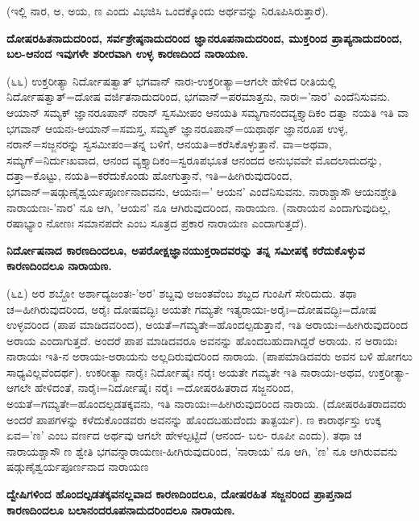 (ಇಲ್ಲಿ ನಾರ, ಅ, ಅಯ, ಣ ಎಂದು ವಿಭಜಿಸಿ ಒಂದಕ್ಕೊಂದು ಅರ್ಥವನ್ನು ನಿರೂಪಿಸಿರುತ್ತಾರೆ).

\begin{center}
\textbf{ದೋಷರಹಿತನಾದುದರಿಂದ, ಸರ್ವಶ್ರೇಷ್ಠನಾದುದರಿಂದ ಜ್ಞಾನರೂಪನಾದುದರಿಂದ, ಮುಕ್ತರಿಂದ ಪ್ರಾಪ್ಯನಾದುದರಿಂದ, ಬಲ-ಆನಂದ ಇವುಗಳೇ ಶರೀರವಾಗಿ ಉಳ್ಳ ಕಾರಣದಿಂದ ನಾರಾಯಣ.}
\end{center}

(೬೬) ಉಕ್ತರೀತ್ಯಾ ನಿರ್ದೋಷತ್ವಾತ್ ಭಗವಾನ್ ನಾರಃ-ಉಕ್ತರೀತ್ಯಾ=ಆಗಲೇ ಹೇಳಿದ ರೀತಿಯಲ್ಲಿ ನಿರ್ದೋಷತ್ವಾತ್=ದೋಷ ವರ್ಜಿತನಾದುದರಿಂದ, ಭಗವಾನ್=ಪರಮಾತ್ತನು, ನಾರಃ='ನಾರ' ಎಂದೆನಿಸುವನು. ಆಯಾನ್ ಸಮ್ಯಕ್ ಜ್ಞಾನರೂಪಾನ್ ನರಾನ್ ಸ್ವಸಮೀಪಂ ಆನಯತಿ ಸಮ್ಯಗಾನಂದವ್ಯಕ್ತ್ಯಾದಿಕಂ ದತ್ವಾ ನಯತಿ ಇತಿ ವಾ ಭಗವಾನ್ ಆಯನಃ-ಆಯಾನ್=ಸಮಸ್ತ, ಸಮ್ಯಕ್ ಜ್ಞಾನರೂಪಾನ್=ಯಥಾರ್ಥ ಜ್ಞಾನರೂಪ ಉಳ್ಳ, ನರಾನ್=ಸಜ್ಜನರನ್ನು ಸ್ವಸಮೀಪಂ=ತನ್ನ ಬಳಿಗೆ, ಆನಯತಿ=ಕರೆಸಿಕೊಳ್ಳುತ್ತಾನೆ. ವಾ=ಅಥವಾ, ಸಮ್ಯಗ್=ನಿರ್ದುಃಖವಾದ, ಆನಂದ ವ್ಯಕ್ತ್ಯಾದಿಕಂ=ಸ್ವರೂಪಭೂತ ಆನಂದದ ಅನುಭವವೇ ಮೊದಲಾದುದನ್ನು, ದತ್ತಾ=ಕೊಟ್ಟು, ನಯತಿ=ಕರೆದುಕೊಂಡು ಹೋಗುತ್ತಾನೆ, ಇತಿ=ಹೀಗಿರುವುದರಿಂದ, ಭಗವಾನ್=ಷಡ್ಗುಣೈಶ್ವರ್ಯಪೂರ್ಣನಾದವನು, ಆಯನಃ=' ಆಯನ' ಎಂದೆನಿಸುವನು. ನಾರಾಶ್ಚಾಸೌ ಆಯನಶ್ಚೇತಿ ನಾರಾಯಣಃ-'ನಾರ' ನೂ ಆಗಿ, 'ಆಯನ' ನೂ ಆಗಿರುವುದರಿಂದ, ನಾರಾಯಣ. (ನಾರಾಯನ ಎಂದಾಗುವುದಿಲ್ಲ, ರಷಾಭ್ಯಾಂ ನೋಣಃ ಸಮಾನಪದೇ ಎಂಬ ಸೂತ್ರದ ಪ್ರಕಾರ ನಾರಾಯಣ ಎಂದಾಗುತ್ತದೆ).

\begin{center}
\textbf{ನಿರ್ದೋಷನಾದ ಕಾರಣದಿಂದಲೂ, ಅಪರೋಕ್ಷಜ್ಞಾನಯುಕ್ತರಾದವರನ್ನು ತನ್ನ ಸಮೀಪಕ್ಕೆ ಕರೆದುಕೊಳ್ಳುವ ಕಾರಣದಿಂದಲೂ ನಾರಾಯಣ.}
\end{center}

(೬೭) ಅರ ಶಬ್ದೋ ಅರ್ಶಾದ್ಯಜಂತಃ-'ಅರ' ಶಬ್ದವು ಅಜಂತವೆಂಬ ಶಬ್ದದ ಗುಂಪಿಗೆ ಸೇರಿದುದು. ತಥಾ ಚ=ಹೀಗಿರುವುದರಿಂದ, ಅರೈಃ ದೋಷವದ್ಭಿಃ ಅಯತೇ ಗಮ್ಯತೇ ಇತ್ಯರಾಯಃ-ಅರೈಃ=ದೋಷವದ್ಭಿಃ=ದೋಷ ಉಳ್ಳವರಿಂದ (ಪಾಪ ಮಾಡಿದವರಿಂದ), ಅಯತೆ=ಗಮ್ಯತೇ=ಹೊಂದಲ್ಪಡುತ್ತಾನೆ, ಇತಿ ಅರಾಯಃ=ಹೀಗಿರುವುದರಿಂದ ಅರಾಯ ಎಂದಾಗುತ್ತದೆ. ಅಂದರೆ ಪಾಪ ಮಾಡಿದವರೂ ಅವನನ್ನು ಹೊಂದಬಹುದಾಗಿದ್ದರೆ ಅರಾಯ. ನ ಅರಾಯಃ ನಾರಾಯಃ ಇತಿ-ನ ಅರಾಯಃ-ಅರಾಯನು ಅಲ್ಲದಿರುವುದರಿಂದ ನಾರಾಯ. (ಪಾಪಮಾಡಿದವರು ಅವನ ಬಳಿ ಹೋಗಲು ಸಾಧ್ಯವಿಲ್ಲವೆಂದರ್ಥ). ಉಕರೀತ್ಯಾ ನಾರೈಃ ನಿರ್ದೋಷೈಃ ನರೈಃ ಅಯತೇ ಗಮ್ಯತೇ ಇತಿ ನಾರಾಯಃ-ಅಥವ, ಉಕ್ತರೀತ್ಯಾ-ಆಗಲೇ ಹೇಳಿದಂತೆ, ನಾರೈಃ=ನಿರ್ದೋಷೈಃ ನರೈಃ =ದೋಷರಹಿತರಾದ ಸಜ್ಜನರಿಂದ, ಅಯತೆ=ಗಮ್ಯತೇ=ಹೊಂದಲ್ಪಡತಕ್ಕವನು, ಇತಿ ನಾರಾಯಃ=ಹೀಗಿರುವುದರಿಂದ ನಾರಾಯ. (ದೋಷರಹಿತರಾದವರು ಅಂದರೆ ಪಾಪಗಳನ್ನು ಕಳೆದುಕೊಂಡವರು ಅವನನ್ನು ಹೊಂದಬಹುದೆಂದು ತಾತ್ಪರ್ಯ). ಣ ಕಾರಾರ್ಥಸ್ತು ಉಕ್ಕ ಏವ='ಣ' ಎಂಬ ವರ್ಣದ ಅರ್ಥವು ಆಗಲೇ ಹೇಳಲ್ಪಟ್ಟಿದೆ (ಆನಂದ- ಬಲ- ರೂಪೀ ಎಂದು). ತಥಾ ಚ ನಾರಾಯಶ್ಚಾಸೌ ಣ ಶ್ವೇತಿ ಭಗವನ್ನಾರಾಯಣಃ-ಹೀಗಿರುವುದರಿಂದ, 'ನಾರಾಯ' ನೂ ಆಗಿ, 'ಣ' ನೂ ಆಗಿರುವವನು ಷಡ್ಗುಣೈಶ್ವರ್ಯಪೂರ್ಣನಾದ ನಾರಾಯಣ

\begin{center}
\textbf{ದ್ವೇಷಿಗಳಿಂದ ಹೊಂದಲ್ಪಡತಕ್ಕವನಲ್ಲವಾದ ಕಾರಣದಿಂದಲೂ, ದೋಷರಹಿತ ಸಜ್ಜನರಿಂದ ಪ್ರಾಪ್ತನಾದ ಕಾರಣದಿಂದಲೂ ಬಲಾನಂದರೂಪನಾದುದರಿಂದಲೂ ನಾರಾಯಣ.}
\end{center}

